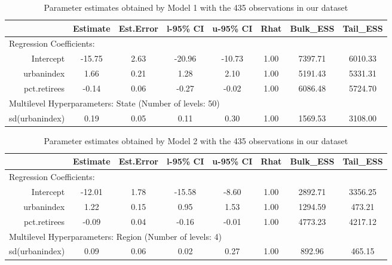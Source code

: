 \documentclass[12pt]{article}
\begin{document}
\begin{table}[ht]
	\centering
	 \begin{adjustbox}{max width=\textwidth}
	\begin{tabular}{rccccccc}
		\hline
		& Estimate & Est.Error & l-95\% CI & u-95\% CI & Rhat & Bulk\_ESS & Tail\_ESS \\ 
		\hline
		\multicolumn{8}{l}{Regression Coefficients:} \\
		Intercept & -15.75 & 2.63 & -20.96 & -10.73 & 1.00 & 7397.71 & 6010.33 \\ 
		urbanindex & 1.66 & 0.21 & 1.28 & 2.10 & 1.00 & 5191.43 & 5331.31 \\ 
		pct.retirees & -0.14 & 0.06 & -0.27 & -0.02 & 1.00 & 6086.48 & 5724.70 \\
		\midrule
		\multicolumn{8}{l}{Multilevel Hyperparameters: State (Number of levels: 50)}                       \\ 
		sd(urbanindex) & 0.19 & 0.05 & 0.11 & 0.30 & 1.00 & 1569.53 & 3108.00 \\ 
		\hline
	\end{tabular}
		\end{adjustbox}
	\caption{Parameter estimates obtained by Model 1 with the 435 observations in our dataset}
	\label{tab:model1}
\end{table}


\begin{table}[ht]
	\centering
		 \begin{adjustbox}{max width=\textwidth}
	\begin{tabular}{rccccccc}
		\hline
		               & Estimate & Est.Error & l-95\% CI & u-95\% CI & Rhat & Bulk\_ESS & Tail\_ESS \\
		               \hline
 \multicolumn{8}{l}{Regression Coefficients:} \\
		     Intercept &   -12.01 &      1.78 &    -15.58 &     -8.60 & 1.00 &   2892.71 &   3356.25 \\
		    urbanindex &     1.22 &      0.15 &      0.95 &      1.53 & 1.00 &   1294.59 &    473.21 \\
		  pct.retirees &    -0.09 &      0.04 &     -0.16 &     -0.01 & 1.00 &   4773.23 &   4217.12 \\
		  \midrule
		  \multicolumn{8}{l}{Multilevel Hyperparameters: Region (Number of levels: 4)}                       \\
		sd(urbanindex) &     0.09 &      0.06 &      0.02 &      0.27 & 1.00 &    892.96 &    465.15 \\ \hline
	\end{tabular}
	\end{adjustbox}
	\caption{Parameter estimates obtained by Model 2 with the 435 observations in our dataset}
	\label{tab:model2}
\end{table}
\end{document}
